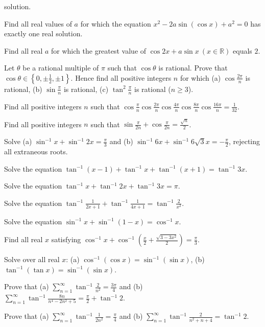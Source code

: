   solution.
\item Find all real values of $a$ for which the equation $x^2 - 2a\sin(\cos x) + a^2 = 0$ has exactly one real
  solution.
\item Find all real $a$ for which the greatest value of $\cos2x + a\sin x\ (x\in\mathbb{R})$ equals $2$.
\item Let $\theta$ be a rational multiple of $\pi$ such that $\cos\theta$ is rational. Prove that
  $\cos\theta\in\left\{0, \pm\frac{1}{2}, \pm1\right\}$. Hence find all positive integers $n$ for which (a)
  $\cos\frac{2\pi}{n}$ is rational, (b) $\sin\frac{\pi}{n}$ is rational, (c) $\tan^2\frac{\pi}{n}$ is rational
  ($n\ge 3$).
\item Find all positive integers $n$ such that $\cos\frac{\pi}{n}\cos\frac{2\pi}{n}\cos\frac{4\pi}{n}
  \cos\frac{8\pi}{n}\cos\frac{16\pi}{n} = \frac{1}{32}$.
\item Find all positive integers $n$ such that $\sin\frac{\pi}{2n} + \cos\frac{\pi}{2n} = \frac{\sqrt{n}}{2}$.
\item Solve (a) $\sin^{-1}x + \sin^{-1}2x = \frac{\pi}{3}$ and (b) $\sin^{-1}6x + \sin^{-1}6\sqrt{3}x =
  -\frac{\pi}{2}$, rejecting all extraneous roots.
\item Solve the equation $\tan^{-1}(x - 1) + \tan^{-1}x + \tan^{-1}(x + 1) = \tan^{-1}3x$.
\item Solve the equation $\tan^{-1}x + \tan^{-1}2x + \tan^{-1}3x = \pi$.
\item Solve the equation $\tan^{-1}\frac{1}{2x + 1} + \tan^{-1}\frac{1}{4x + 1} = \tan^{-1}\frac{2}{x^2}$.
\item Solve the equation $\sin^{-1}x + \sin^{-1}(1 - x) = \cos^{-1}x$.
\item Find all real $x$ satisfying $\cos^{-1}x + \cos^{-1}\left(\frac{x}{2} + \frac{\sqrt{3 - 3x^2}}{2}\right)
  = \frac{\pi}{3}$.
\item Solve over all real $x$: (a) $\cos^{-1}(\cos x) = \sin^{-1}(\sin x)$, (b) $\tan^{-1}(\tan x) =
  \sin^{-1}(\sin x)$.
\item Prove that (a) $\displaystyle\sum_{n = 1}^\infty\tan^{-1}\frac{2}{n^2} = \frac{3\pi}{4}$ and (b)
  $\displaystyle\sum_{n = 1}^\infty\tan^{-1}\frac{8n}{n^4 - 2n^2 + 5} = \frac{\pi}{2} + \tan^{-1}2$.
\item Prove that (a) $\displaystyle\sum_{n = 1}^\infty\tan^{-1}\frac{1}{2n^2} = \frac{\pi}{4}$ and (b)
  $\displaystyle\sum_{n = 1}^\infty\tan^{-1}\frac{2}{n^2 + n + 4} = \tan^{-1}2$.
